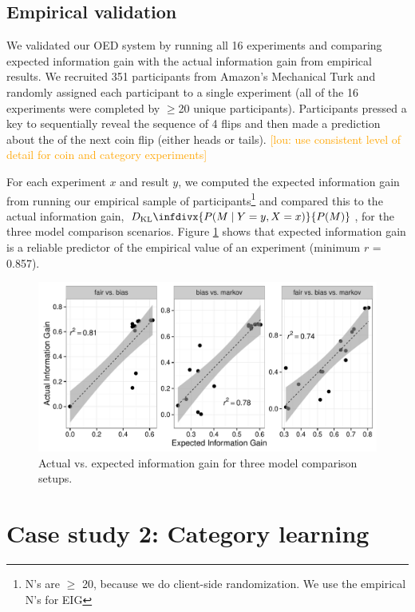 \documentclass{article}
\newcommand{\dkl}{D_\mathrm{KL}\infdivx}
\newcommand{\lou}[1]{\textcolor{orange}{[lou: #1]}}
\begin{document}


\subsection{Empirical validation}
We validated our OED system by running all 16 experiments and comparing expected information gain with the actual information gain from empirical results.
We recruited 351 participants from Amazon's Mechanical Turk and randomly assigned each participant to a single experiment (all of the 16 experiments were completed by $\geq$20 unique participants).
Participants pressed a key to sequentially reveal the sequence of 4 flips and then made a prediction about the of the next coin flip (either heads or tails).
\lou{use consistent level of detail for coin and category experiments}

For each experiment $x$ and result $y$, we computed the expected information gain from running our empirical sample of participants\footnote{N's are $\geq$ 20, because we do client-side randomization. We use the empirical N's for EIG} and compared this to the actual information gain, $\dkl{P(M \mid Y = y, X = x)}{P(M)}$, for the three model comparison scenarios.
Figure \ref{fig:aig_vs_eig} shows that expected information gain is a reliable predictor of the empirical value of an experiment (minimum $r$ = 0.857).

\begin{figure}[t]
\centering
\includegraphics[width=0.7\columnwidth]{img/coin_eig_aig_scatter_noText.pdf}
\caption{Actual vs. expected information gain for three model comparison setups.}
\label{fig:aig_vs_eig}
\end{figure}

\section{Case study 2: Category learning}
\end{document}
